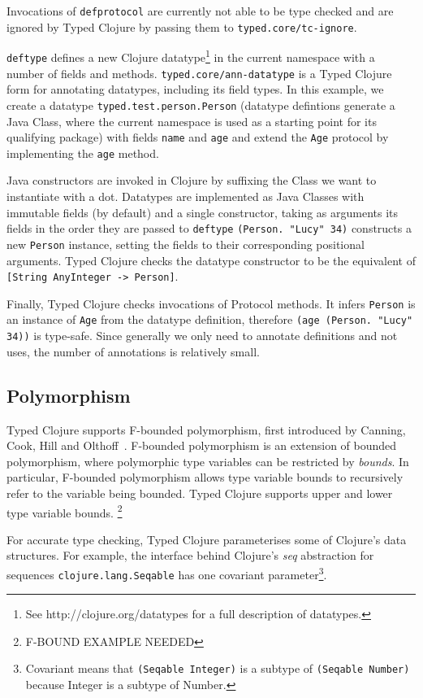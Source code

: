 Invocations of \lstinline|defprotocol| are currently not able to be type checked
and are ignored by Typed Clojure by passing them to \lstinline|typed.core/tc-ignore|.

\lstinline|deftype|
defines a new Clojure datatype\footnote{See http://clojure.org/datatypes for a full description of datatypes.}
in the current namespace with a number of fields and methods. 
\lstinline|typed.core/ann-datatype| is a Typed Clojure form for annotating datatypes, including its field types.
In this example, we create a datatype \lstinline|typed.test.person.Person|
(datatype defintions generate a Java Class, where the current namespace is used as a starting point for its
qualifying package)
with fields \lstinline|name| and \lstinline|age| and 
extend the \lstinline|Age| protocol by implementing the \lstinline|age| method.

Java constructors are invoked in Clojure by suffixing the Class we want to instantiate with a dot.
Datatypes are implemented as Java Classes with immutable fields (by default) and a single constructor, taking as arguments its fields 
in the order they are passed to \lstinline|deftype|
\lstinline|(Person. "Lucy" 34)| constructs a new \lstinline|Person|
instance, setting the fields to their corresponding positional arguments.
Typed Clojure checks the datatype constructor to be the equivalent of 
\lstinline|[String AnyInteger -> Person]|.

Finally, Typed Clojure checks invocations of Protocol methods. It infers \lstinline|Person|
is an instance of \lstinline|Age| from the datatype definition, therefore \lstinline|(age (Person. "Lucy" 34))| is type-safe.
Since generally we only need to annotate definitions and not uses, the number of annotations is relatively small.

\subsection{Polymorphism}

Typed Clojure supports F-bounded polymorphism, first introduced by Canning, Cook, Hill and Olthoff~\cite{CCHOM89}. 
F-bounded polymorphism is an extension of bounded polymorphism, where polymorphic type variables
can be restricted by \emph{bounds}.
In particular, F-bounded polymorphism allows type variable bounds to recursively refer to the
variable being bounded. Typed Clojure supports upper and lower type variable bounds.
\footnote{F-BOUND EXAMPLE NEEDED}

For accurate type checking, Typed Clojure parameterises some of Clojure's data structures. For example,
the interface behind Clojure's \emph{seq} abstraction for sequences \lstinline|clojure.lang.Seqable| has one 
covariant parameter\footnote{Covariant means that \lstinline|(Seqable Integer)| is a subtype of \lstinline|(Seqable Number)|
because Integer is a subtype of Number.}.

